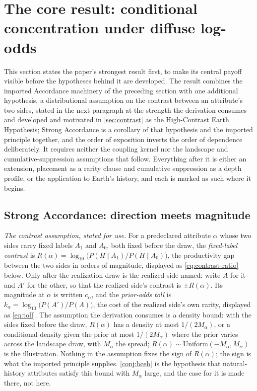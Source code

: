 \documentclass[11pt]{article}
\theoremstyle{definition}
\begin{document}
\section{The core result: conditional concentration under diffuse log-odds}\label{sec:core}

This section states the paper's strongest result first, to make its central payoff visible before the hypotheses behind it are developed. The result combines the imported Accordance machinery of the preceding section with one additional hypothesis, a distributional assumption on the contrast between an attribute's two sides, stated in the next paragraph at the strength the derivation consumes and developed and motivated in \autoref{sec:contrast} as the High-Contrast Earth Hypothesis; Strong Accordance is a corollary of that hypothesis and the imported principle together, and the order of exposition inverts the order of dependence deliberately. It requires neither the coupling kernel nor the landscape and cumulative-suppression assumptions that follow. Everything after it is either an extension, placement as a rarity clause and cumulative suppression as a depth profile, or the application to Earth's history, and each is marked as such where it begins.

\subsection{Strong Accordance: direction meets magnitude} \label{sec:oec-strong}

\noindent\textit{The contrast assumption, stated for use.} For a predeclared attribute $\alpha$ whose two sides carry fixed labels $A_1$ and $A_0$, both fixed before the draw, the \emph{fixed-label contrast} is $R(\alpha) = \log_{10}\big(P(H \mid A_1)/P(H \mid A_0)\big)$, the productivity gap between the two sides in orders of magnitude, displayed as \eqref{eq:contrast-ratio} below. Only after the realization draw is the realized side named: write $A$ for it and $A'$ for the other, so that the realized side's contrast is $\pm R(\alpha)$. Its magnitude at $\alpha$ is written $c_\alpha$, and the \emph{prior-odds toll} is $k_\alpha = \log_{10}\big(P(A')/P(A)\big)$, the cost of the realized side's own rarity, displayed as \eqref{eq:toll}. The assumption the derivation consumes is a density bound: with the sides fixed before the draw, $R(\alpha)$ has a density at most $1/(2M_\alpha)$, or a conditional density given the prior at most $1/(2M_\alpha)$ where the prior varies across the landscape draw, with $M_\alpha$ the spread; $R(\alpha) \sim \mathrm{Uniform}(-M_\alpha, M_\alpha)$ is the illustration. Nothing in the assumption fixes the sign of $R(\alpha)$; the sign is what the imported principle supplies. \autoref{conj:hceh} is the hypothesis that natural-history attributes satisfy this bound with $M_\alpha$ large, and the case for it is made there, not here.
\end{document}
